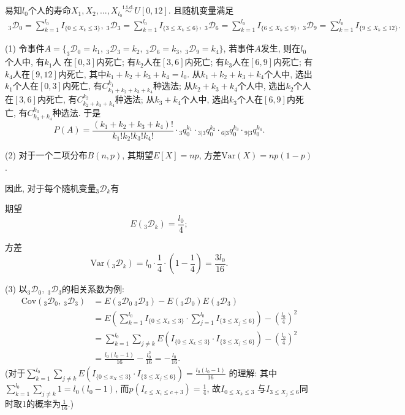 \documentclass[lang=cn,10pt]{elegantbook}
\begin{document}
\begin{solution}
易知$l_{0}$个人的寿命$X_{1},X_{2},...,X_{l_{0}}\stackrel{\text{i.i.d.}}{\sim}U[0,12]$. 且随机变量满足
\begin{align*}
  {}_{3}\mathscr D _{0}=\sum^{l_{0}}_{k=1}I_{\{0\leq X_k \leq 3\}},~{}_{3}\mathscr D _{3}=\sum^{l_{0}}_{k=1}I_{\{3\leq X_k \leq 6\}},~{}_{3}\mathscr D _{6}=\sum^{l_{0}}_{k=1}I_{\{6\leq X_k \leq 9\}},~{}_{3}\mathscr D _{9}=\sum^{l_{0}}_{k=1}I_{\{9\leq X_k \leq 12\}}.
\end{align*}

(1) 令事件$A=\{_{3}\mathscr D _{0}=k_{1},\ _{3}\mathscr D _{3}=k_{2},\ _{3}\mathscr D _{6}=k_{3},\ _{3}\mathscr D _{9}=k_{4}\}$, 若事件$A$发生, 则在$l_{0}$个人中, 有$k_{1}$人
在$[0,3]$内死亡; 有$k_{2}$人在$[3,6]$内死亡; 有$k_{3}$人在$[6,9]$内死亡; 有$k_{4}$人在$[9,12]$内死亡, 其中$k_{1}+k_{2}+k_{3}+k_{4}=l_{0}.$ 从$k_{1}+k_{2}+k_{3}+k_{4}$个人中, 选出$k_{1}$个人在$[0,3]$内死亡, 有$C_{k_{1}+k_{2}+k_{3}+k_{4}}^{k_{1}}$种选法; 从$k_{2}+k_{3}+k_{4}$个人中, 选出$k_{2}$个人在$[3,6]$内死亡, 有$C_{k_{2}+k_{3}+k_{4}}^{k_{2}}$种选法; 从$k_{3}+k_{4}$个人中, 选出$k_{3}$个人在$[6,9]$内死亡, 有$C_{k_{3}+k_{4}}^{k_{3}}$种选法. 于是
$$
    P(A)=\frac{(k_{1}+k_{2}+k_{3}+k_{4})!}{k_{1}!k_{2}!k_{3}!k_{4}!}\cdot {}_{3}q_{0}^{k_{1}}\cdot {}_{3|3}q_{0}^{k_{2}}\cdot {}_{6|3}q_{0}^{k_{3}}\cdot {}_{9|3}q_{0}^{k_{4}}.
$$

(2) 对于一个二项分布$B(n, p)$, 其期望$E[X] = np$, 方差$\text{Var}(X) = np(1-p)$.

因此, 对于每个随机变量$_{3}\mathscr D_{k}$有

期望 $$E(_{3}\mathscr D_{k}) = \frac{l_0}{4};$$

方差 $$\text{Var}(_{3}\mathscr D_{k}) = l_0 \cdot \frac{1}{4} \cdot \left(1 - \frac{1}{4}\right) = \frac{3l_0}{16}.$$

(3) 以$_{3}\mathscr D _{0},\ _{3}\mathscr D _{3}$的相关系数为例:
\begin{equation*}
\begin{aligned}
    \text{Cov}(_{3}\mathscr D _{0},\ _{3}\mathscr D _{3}) & =E({}_{3}\mathscr D _{0}\ _{3}\mathscr D _{3})-E(_{3}\mathscr D _{0})E(_{3}\mathscr D _{3})                                \\
                                                          & =E(\sum ^{l_{0}}_{k=1}I_{\{0\leq X_{k}\leq 3\}}\cdot \sum ^{l_{0}}_{j=1}I_{\{3\leq X_{j}\leq 6\}})-(\frac{l_{0}}{4})^{2} \\
                                                          & =\sum^{l_{0}}_{k=1}\sum_{j\neq k}E(I_{\{0\leq X_{k}\leq 3\}}\cdot I_{\{3\leq X_{j}\leq 6\}})-(\frac{ l_{0}}{4})^{2}      \\
                                                          & =\frac{l_{0}(l_{0}-1)}{16}-\frac{l_{0}^{2}}{16}  =-\frac{l_{0}}{16}.
\end{aligned}
\end{equation*}
(对于$\sum^{l_{0}}_{k=1}\sum_{j\neq k}E(I_{\{0\leq x_{X}\leq 3\}}\cdot I_{\{3\leq X_{j}\leq 6\}}) = \frac{l_{0}(l_{0}-1)}{16}$ 的理解: 其中$\sum^{l_{0}}_{k=1}\sum_{j\neq k}1 = l_0(l_0-1)$, 而$p(I_{c\leq X_{i}\leq c+3}) = \frac14$, 故$I_{0\leq X_{k}\leq 3}$ 与$I_{3\leq X_{j}\leq 6}$同时取1的概率为$\frac{1}{16}$.)


\end{solution}
\end{document}
